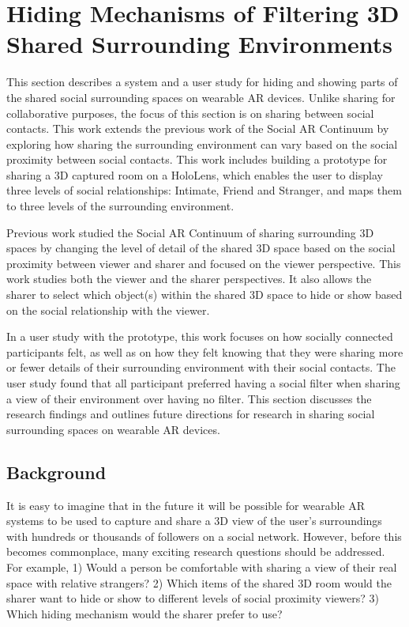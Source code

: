 \pagebreak
\section{Hiding Mechanisms of Filtering 3D Shared Surrounding Environments}
\label{sec:surrounding:hiding}

This section describes a system and a user study for hiding and showing parts of the shared social surrounding spaces on wearable AR devices. Unlike sharing for collaborative purposes, the focus of this section is on sharing between social contacts. This work extends the previous work of the Social AR Continuum by exploring how sharing the surrounding environment can vary based on the social proximity between social contacts. This work includes building a prototype for sharing a 3D captured room on a HoloLens, which enables the user to display three levels of social relationships: Intimate, Friend and Stranger, and maps them to three levels of the surrounding environment.

Previous work studied the Social AR Continuum of sharing surrounding 3D spaces by changing the level of detail of the shared 3D space based on the social proximity between viewer and sharer and focused on the viewer perspective. This work studies both the viewer and the sharer perspectives. It also allows the sharer to select which object(s) within the shared 3D space to hide or show based on the social relationship with the viewer. 

In a user study with the prototype, this work focuses on how socially connected participants felt, as well as on how they felt knowing that they were sharing more or fewer details of their surrounding environment with their social contacts. The user study found that all participant preferred having a social filter when sharing a view of their environment over having no filter. This section discusses the research findings and outlines future directions for research in sharing social surrounding spaces on wearable AR devices. 


\subsection{Background}

It is easy to imagine that in the future it will be possible for wearable AR systems to be used to capture and share a 3D view of the user's surroundings with hundreds or thousands of followers on a social network. However, before this becomes commonplace, many exciting research questions should be addressed. For example, 1) Would a person be comfortable with sharing a view of their real space with relative strangers? 2) Which items of the shared 3D room would the sharer want to hide or show to different levels of social proximity viewers? 3) Which hiding mechanism would the sharer prefer to use?

